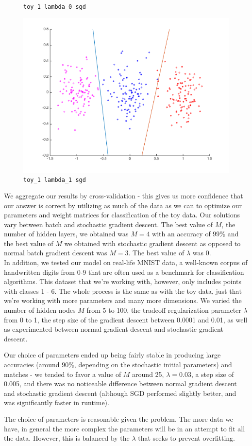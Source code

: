 \documentclass[11pt,letterpaper]{article}
\begin{document}
\begin{figure}[!htb]
  \caption{\texttt{toy\_1 lambda\_0 sgd}}\label{fig:gradDifSs}
\endminipage\hfill
{}
  \includegraphics[width=\linewidth]{figures/sgd_lambda1_toy.png}
  \caption{\texttt{toy\_1 lambda\_1 sgd}}\label{fig:gradDifS}
\endminipage
\end{figure}
We aggregate our results by cross-validation - this gives us more confidence that our answer is correct by utilizing as much of the data as we can to optimize our parameters and weight matrices for classification of the toy data. Our solutions vary between batch and stochastic gradient descent. The best value of $M$, the number of hidden layers, we obtained was $M=4$ with an accuracy of $99\%$ and the best value of $M$ we obtained with stochastic gradient descent as opposed to normal batch gradient descent was $M=3$. The best value of $\lambda$ was 0.\\

In addition, we tested our model on real-life MNIST data, a well-known corpus of handwritten digits from 0-9 that are often used as a benchmark for classification algorithms. This dataset that we're working with, however, only includes points with classes 1 - 6. The whole process is the same as with the toy data, just that we're working with more parameters and many more dimensions. We varied the number of hidden nodes $M$ from 5 to 100, the tradeoff regularization parameter $\lambda$ from 0 to 1, the step size of the gradient descent between 0.0001 and 0.01, as well as experimented between normal gradient descent and stochastic gradient descent.

Our choice of parameters ended up being fairly stable in producing large accuracies (around $90\%$, depending on the stochastic initial parameters) and matches - we tended to favor a value of $M$ around 25, $\lambda=0.03$, a step size of 0.005, and there was no noticeable difference between normal gradient descent and stochastic gradient descent (although SGD performed slightly better, and was significantly faster in runtime).

The choice of parameters is reasonable given the problem. The more data we have, in general the more complex the parameters will be in an attempt to fit all the data. However, this is balanced by the $\lambda$ that seeks to prevent overfitting.
\end{document}
